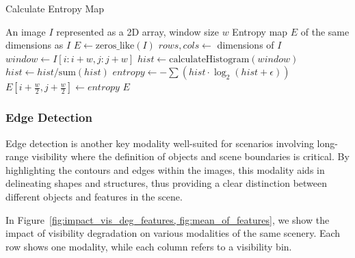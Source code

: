 \begin{algorithm}[htbp]
\caption{Calculate Entropy Map}\label{alg:entropy_map}
\begin{algorithmic}[1]
\Require An image $I$ represented as a 2D array, window size $w$
\Ensure Entropy map $E$ of the same dimensions as $I$
\State $E \gets \text{zeros\_like}(I)$ 
\State $rows, cols \gets$ dimensions of $I$ 
 
     
        \State $window \gets I[i : i+w, j : j+w]$ 
        \State $hist \gets \text{calculateHistogram}(window)$ 
        \State $hist \gets hist / \text{sum}(hist)$ 
        \State $entropy \gets -\sum (hist \cdot \log_2(hist + \epsilon))$ 
        \State $E[i + \frac{w}{2}, j + \frac{w}{2}] \gets entropy$ 
    \EndFor
\EndFor
\State \Return $E$ 
\end{algorithmic}
\end{algorithm}


\subsubsection{Edge Detection}
Edge detection is another key modality well-suited for scenarios involving long-range visibility where the definition of objects and scene boundaries is critical. By highlighting the contours and edges within the images, this modality aids in delineating shapes and structures, thus providing a clear distinction between different objects and features in the scene. 



 In Figure~\ref{fig:impact_vis_deg_features, fig:mean_of_features}, we show the impact of visibility degradation on various modalities of the same scenery. Each row shows one modality, while each column refers to a visibility bin.